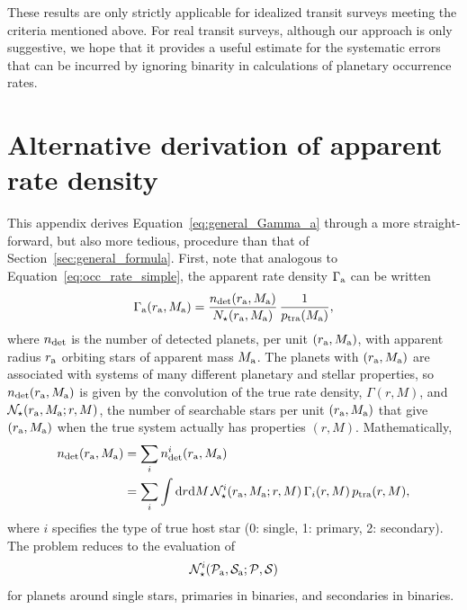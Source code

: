 \documentclass[12pt,modern]{aastex61}
\newcommand{\pp}{\mathcal{P}}
\newcommand{\ps}{\mathcal{S}}
\renewcommand{\a}{_{\rm a}}
\begin{document}
These results are only strictly applicable for idealized transit
surveys meeting the criteria mentioned above.  For real transit
surveys, although our approach is only suggestive, we hope that it
provides a useful estimate for the systematic errors that can be
incurred by ignoring binarity in calculations of planetary occurrence
rates.


\newpage
\appendix
\section{Alternative derivation of apparent rate density}
\label{sec:appendix}

This appendix derives Equation~\ref{eq:general_Gamma_a} through a more
straight-forward, but also more tedious, procedure than that of
Section~\ref{sec:general_formula}.   First, note that analogous to
Equation~\ref{eq:occ_rate_simple}, the apparent rate density $\Gamma\a$ can be
written
\begin{equation}
    \Gamma\a(r\a,M\a) = \frac{n_{\rm det}(r\a,M\a)}{N_\star(r\a,M\a)}
    \, \frac{1}{p_{\rm tra}(M\a)},
\label{eq:apparent_rate_density}
\end{equation}
where $n_{\rm det}$ is the number of detected planets, per unit
$(r\a, M\a)$, with apparent radius $r\a$ orbiting stars of
apparent mass $M\a$.   The planets with $(r\a, M\a)$ are associated
with systems of many different planetary and stellar properties, so
$n_{\rm det}(r\a, M\a)$ is given by the convolution of the true rate
density, $\Gamma(r, M)$, and $\mathcal{N}_\star(r\a, M\a; r, M)$, the
number of searchable stars per unit $(r\a, M\a)$ that give $(r\a,
M\a)$  when the true system actually has properties $(r, M)$.
Mathematically,
\begin{align}
    n_{\rm det}(r\a, M\a) &=
    \sum_i n_{\rm det}^i(r\a, M\a) \\
    &=
    \sum_i \int \mathrm{d}r \mathrm{d}M \,
    \mathcal{N}_\star^i(r\a,M\a; r,M)
    \, \Gamma_i(r,M) \, p_{\rm tra}(r,M),
    \label{eq:n_det}
\end{align}
where $i$ specifies the type of true host star (0: single, 1:
primary, 2: secondary).  The problem reduces to the evaluation of
\begin{equation}
    \mathcal{N}_\star^i(\pp\a,\ps\a; \pp, \ps)
\end{equation}
for planets around single stars, primaries in binaries, and
secondaries in binaries. 
\end{document}
